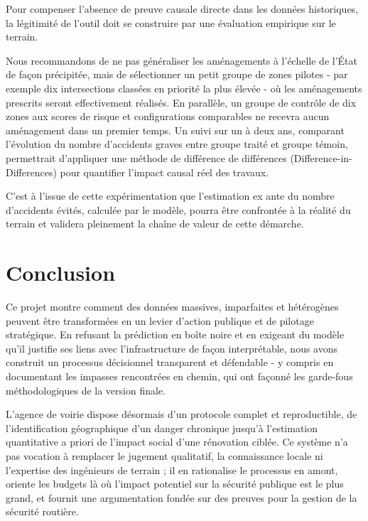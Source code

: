 \documentclass[12pt, a4paper]{article}
\begin{document}
Pour compenser l'absence de preuve causale directe dans les données historiques, la légitimité de l'outil doit se construire par une évaluation empirique sur le terrain.

Nous recommandons de ne pas généraliser les aménagements à l'échelle de l'État de façon précipitée, mais de sélectionner un petit groupe de zones pilotes - par exemple dix intersections classées en priorité la plus élevée - où les aménagements prescrits seront effectivement réalisés. En parallèle, un groupe de contrôle de dix zones aux scores de risque et configurations comparables ne recevra aucun aménagement dans un premier temps. Un suivi sur un à deux ans, comparant l'évolution du nombre d'accidents graves entre groupe traité et groupe témoin, permettrait d'appliquer une méthode de différence de différences (Difference-in-Differences) pour quantifier l'impact causal réel des travaux.

C'est à l'issue de cette expérimentation que l'estimation ex ante du nombre d'accidents évités, calculée par le modèle, pourra être confrontée à la réalité du terrain et validera pleinement la chaîne de valeur de cette démarche.

\section{Conclusion}

Ce projet montre comment des données massives, imparfaites et hétérogènes peuvent être transformées en un levier d'action publique et de pilotage stratégique. En refusant la prédiction en boîte noire et en exigeant du modèle qu'il justifie ses liens avec l'infrastructure de façon interprétable, nous avons construit un processus décisionnel transparent et défendable - y compris en documentant les impasses rencontrées en chemin, qui ont façonné les garde-fous méthodologiques de la version finale.

L'agence de voirie dispose désormais d'un protocole complet et reproductible, de l'identification géographique d'un danger chronique jusqu'à l'estimation quantitative a priori de l'impact social d'une rénovation ciblée. Ce système n'a pas vocation à remplacer le jugement qualitatif, la connaissance locale ni l'expertise des ingénieurs de terrain ; il en rationalise le processus en amont, oriente les budgets là où l'impact potentiel sur la sécurité publique est le plus grand, et fournit une argumentation fondée sur des preuves pour la gestion de la sécurité routière.
\end{document}
